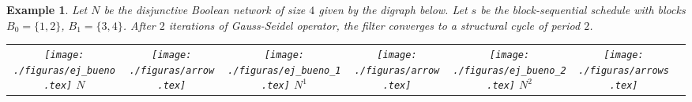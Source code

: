 \documentclass[preprint,12pt]{elsarticle}
\newcommand{\GS}{\textit{GS}}
\newtheorem{exmp}{Example}
\begin{document}
\begin{exmp}
Let $N$ be the disjunctive Boolean network of size $4$ given by the digraph below. Let $s$ be the block-sequential schedule with blocks $B_0=\{1,2\}$, $B_1=\{3,4\}$. After $2$ iterations of Gauss-Seidel operator, the filter converges to %
a structural cycle of period %
$2$. %

\begin{tabular}{ccccccc}

\begin{minipage}{40 pt}
    \texttt{[image: ./figuras/ej\_bueno.tex]}
\textit{$N$}
\end{minipage}

&
\begin{minipage}{40 pt}
    \texttt{[image: ./figuras/arrow.tex]}
\end{minipage}
&

\begin{minipage}{40 pt}
    \texttt{[image: ./figuras/ej\_bueno\_1.tex]}
\textit{$N^1$}
\end{minipage}

&
\begin{minipage}{40 pt}
    \texttt{[image: ./figuras/arrow.tex]}
\end{minipage}
&

\begin{minipage}{40 pt}
    \texttt{[image: ./figuras/ej\_bueno\_2.tex]}
\textit{$N^2$}
\end{minipage}

&
\begin{minipage}{40 pt}
    \texttt{[image: ./figuras/arrows.tex]}
\end{minipage}
&



\end{tabular}
\end{exmp}
\end{document}

